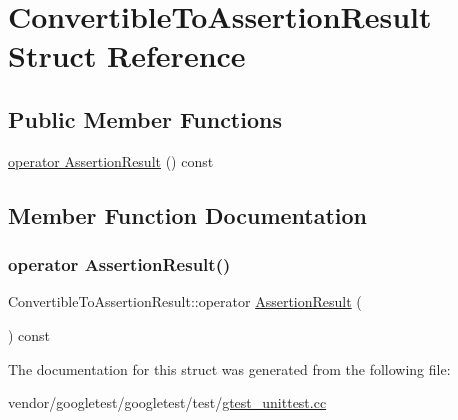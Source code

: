 \hypertarget{struct_convertible_to_assertion_result}{}\section{Convertible\+To\+Assertion\+Result Struct Reference}
\label{struct_convertible_to_assertion_result}
\subsection*{Public Member Functions}
\begin{DoxyCompactItemize}
\item 
\hyperlink{struct_convertible_to_assertion_result_a0f816f2f25ecaf29a95b3cfd4033e105}{operator Assertion\+Result} () const
\end{DoxyCompactItemize}


\subsection{Member Function Documentation}
\mbox{\label{struct_convertible_to_assertion_result_a0f816f2f25ecaf29a95b3cfd4033e105}} 
\subsubsection{\texorpdfstring{operator Assertion\+Result()}{operator AssertionResult()}}
{\footnotesize\ttfamily Convertible\+To\+Assertion\+Result\+::operator \hyperlink{classtesting_1_1_assertion_result}{Assertion\+Result} (\begin{DoxyParamCaption}{ }\end{DoxyParamCaption}) const\hspace{0.3cm}{\ttfamily [inline]}}



The documentation for this struct was generated from the following file\+:\begin{DoxyCompactItemize}
\item 
vendor/googletest/googletest/test/\hyperlink{gtest__unittest_8cc}{gtest\+\_\+unittest.\+cc}\end{DoxyCompactItemize}
